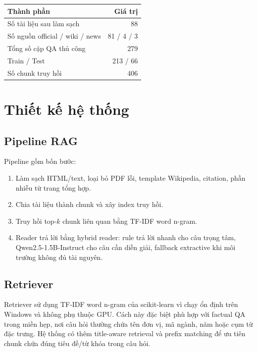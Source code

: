 \documentclass[12pt,a4paper]{article}
\begin{document}
\begin{center}
\begin{tabular}{lr}
\toprule
\textbf{Thành phần} & \textbf{Giá trị} \\
\midrule
Số tài liệu sau làm sạch & 88 \\
Số nguồn official / wiki / news & 81 / 4 / 3 \\
Tổng số cặp QA thủ công & 279 \\
Train / Test & 213 / 66 \\
Số chunk truy hồi & 406 \\
\bottomrule
\end{tabular}
\end{center}

\section{Thiết kế hệ thống}

\subsection{Pipeline RAG}

Pipeline gồm bốn bước:

\begin{enumerate}
  \item Làm sạch HTML/text, loại bỏ PDF lỗi, template Wikipedia, citation, phần nhiễu từ trang tổng hợp.
  \item Chia tài liệu thành chunk và xây index truy hồi.
  \item Truy hồi top-$k$ chunk liên quan bằng TF-IDF word n-gram.
  \item Reader trả lời bằng hybrid reader: rule trả lời nhanh cho câu trọng tâm, Qwen2.5-1.5B-Instruct cho câu cần diễn giải, fallback extractive khi môi trường không đủ tài nguyên.
\end{enumerate}

\subsection{Retriever}

Retriever sử dụng TF-IDF word n-gram của scikit-learn vì chạy ổn định trên Windows và không phụ thuộc GPU. Cách này đặc biệt phù hợp với factual QA trong miền hẹp, nơi câu hỏi thường chứa tên đơn vị, mã ngành, năm hoặc cụm từ đặc trưng. Hệ thống có thêm title-aware retrieval và prefix matching để ưu tiên chunk chứa đúng tiêu đề/từ khóa trong câu hỏi.
\end{document}
